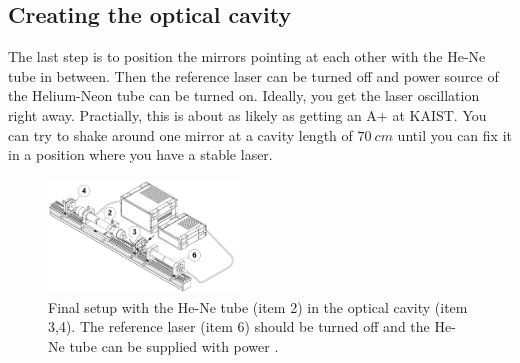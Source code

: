 \subsection{Creating the optical cavity}
\label{sec:Creating the optical cavity}
The last step is to position the mirrors pointing at each other with the He-Ne tube in between. Then
the reference laser can be turned off and power source of the Helium-Neon tube can be turned on.
Ideally, you get the laser oscillation right away. Practially, this is about as likely as getting an
A+ at KAIST. You can try to
shake around one mirror at a cavity length of $\SI{70}{cm}$ until you can fix it in a position where
you have a stable laser.

\begin{figure}
  \centering
  \includegraphics[width=0.45\textwidth]{media/setup.png}
  \caption{Final setup with the He-Ne tube (item 2) in the optical cavity (item 3,4). The reference laser (item 6)
  should be turned off and the He-Ne tube can be supplied with power \cite{elas_manual}.}
  \label{fig:setup}
\end{figure}
